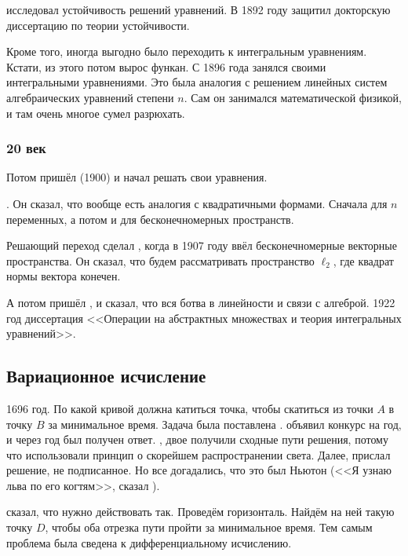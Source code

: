 \documentclass[a4paper,oneside,fleqn,10pt]{article}
\begin{document}
  исследовал устойчивость решений уравнений.
В 1892 году защитил докторскую диссертацию по теории устойчивости.

Кроме того, иногда выгодно было переходить к интегральным уравнениям.
Кстати, из этого потом вырос функан. С 1896 года  занялся своими
интегральными уравнениями. Это была аналогия с решением линейных систем алгебраических уравнений
степени $n$. Сам он занимался математической физикой, и там очень многое сумел разрюхать.

\subsubsection{20 век}

Потом пришёл  (1900) и начал решать свои уравнения.

 . Он сказал, что вообще есть аналогия с квадратичными формами.
Сначала для $n$ переменных, а потом и для бесконечномерных пространств.

Решающий переход сделал , когда в 1907 году ввёл бесконечномерные векторные пространства.
Он сказал, что будем рассматривать пространство $\ell_2$, где квадрат нормы вектора конечен.

А потом пришёл , и сказал, что вся ботва в линейности и связи с алгеброй.
1922 год диссертация  <<Операции на абстрактных множествах и теория интегральных уравнений>>.

\subsection{Вариационное исчисление}

1696 год. По какой кривой должна катиться точка, чтобы скатиться из точки $A$ в точку $B$
за минимальное время. Задача была поставлена .
 объявил конкурс на год, и через год был получен ответ.
, двое  получили сходные пути решения, потому что использовали
принцип  о скорейшем распространении света.
Далее,  прислал решение, не подписанное. Но все догадались, что это был Ньютон
(<<Я узнаю льва по его когтям>>, сказал ).

 сказал, что нужно действовать так.
Проведём горизонталь. Найдём на ней такую точку $D$, чтобы оба отрезка пути
пройти за минимальное время. Тем самым проблема была сведена к дифференциальному
исчислению.
\end{document}
